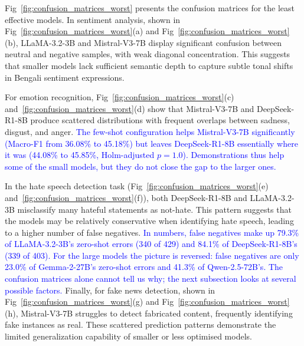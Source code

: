 \documentclass[10pt,letterpaper]{article}
\newcommand{\rev}[1]{\textcolor{blue}{#1}}
\begin{document}
Fig~\ref{fig:confusion_matrices_worst} presents the confusion matrices for the least effective models. In sentiment analysis, shown in Fig~\ref{fig:confusion_matrices_worst}(a) and Fig~\ref{fig:confusion_matrices_worst}(b), LLaMA-3.2-3B and Mistral-V3-7B display significant confusion between neutral and negative samples, with weak diagonal concentration. This suggests that smaller models lack sufficient semantic depth to capture subtle tonal shifts in Bengali sentiment expressions.

For emotion recognition, Fig~\ref{fig:confusion_matrices_worst}(c) and~\ref{fig:confusion_matrices_worst}(d) show that Mistral-V3-7B and DeepSeek-R1-8B produce scattered distributions with frequent overlaps between sadness, disgust, and anger. \rev{The few-shot configuration helps Mistral-V3-7B significantly (Macro-F1 from 36.08\% to 45.18\%) but leaves DeepSeek-R1-8B essentially where it was (44.08\% to 45.85\%, Holm-adjusted $p = 1.0$). Demonstrations thus help some of the small models, but they do not close the gap to the larger ones.}

In the hate speech detection task (Fig~\ref{fig:confusion_matrices_worst}(e) and~\ref{fig:confusion_matrices_worst}(f)), both DeepSeek-R1-8B and LLaMA-3.2-3B misclassify many hateful statements as not-hate. This pattern suggests that the models may be relatively conservative when identifying hate speech, leading to a higher number of false negatives. \rev{In numbers, false negatives make up 79.3\% of LLaMA-3.2-3B's zero-shot errors (340 of 429) and 84.1\% of DeepSeek-R1-8B's (339 of 403). For the large models the picture is reversed: false negatives are only 23.0\% of Gemma-2-27B's zero-shot errors and 41.3\% of Qwen-2.5-72B's. The confusion matrices alone cannot tell us why; the next subsection looks at several possible factors.} Finally, for fake news detection, shown in Fig~\ref{fig:confusion_matrices_worst}(g) and Fig~\ref{fig:confusion_matrices_worst}(h), Mistral-V3-7B struggles to detect fabricated content, frequently identifying fake instances as real. These scattered prediction patterns demonstrate the limited generalization capability of smaller or less optimised models.
\end{document}
